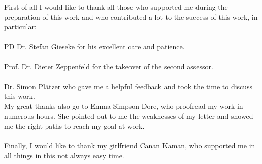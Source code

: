 
First of all I would like to thank all those who supported me during the preparation of this work and who contributed a lot to the success of this work, in particular:\\
\\
PD Dr. Stefan Gieseke for his excellent care and patience.\\
\\
Prof. Dr. Dieter Zeppenfeld for the takeover of the second assessor.\\
\\
Dr. Simon Plätzer who gave me a helpful feedback and took the time to discuss this work.\\
My great thanks also go to Emma Simpson Dore, who proofread my work in numerous hours. She pointed out to me the weaknesses of my letter and showed me the right paths to reach my goal at work.\\
\\ 
Finally, I would like to thank my girlfriend Canan Kaman, who supported me in all things in this not always easy time.\\


 
         

